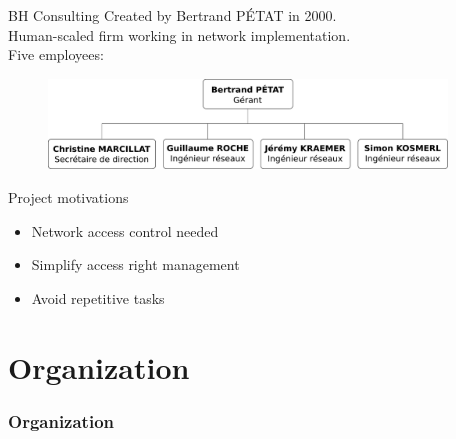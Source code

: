 \documentclass[12pt]{beamer}
\begin{document}
    
\begin{frame}{BH Consulting}
    Created by Bertrand PÉTAT in 2000.\\
    \vfill
    Human-scaled firm working in network implementation.\\
    \vfill
    Five employees:
    \begin{figure}
	\includegraphics[width=300pt]{img/organigramme.pdf}
    \end{figure}
\end{frame}


\begin{frame}{Project motivations}
    \begin{itemize}
	\item<1->Network access control needed
	\vfill
	\item<2->Simplify access right management
	\vfill
	\item<3->Avoid repetitive tasks
    \end{itemize}

\end{frame}
    
\part{Organization}
\frame{\partpage}
\section{Organization}
\end{document}

